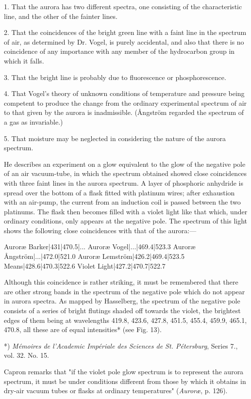 \documentclass[a4paper, 12pt, oneside, polutonikogreek, english]{article}
\begin{document}
1. That the aurora has two different spectra, one consisting of the characteristic line, and the other of the fainter lines.

2. That the coincidences of the bright green line with a faint line in the spectrum of air, as determined by Dr. Vogel, is purely accidental, and also that there is no coincidence of any importance with any member of the hydrocarbon group in which it falls.

3. That the bright line is probably due to fluorescence or phosphorescence.

4. That Vogel's theory of unknown conditions of temperature and pressure being competent to produce the change from the ordinary experimental spectrum of air to that given by the aurora is inadmissible. (Ångström regarded the spectrum of a gas as invariable.)

5. That moisture may be neglected in considering the nature of the aurora spectrum.

He describes an experiment on a glow equivalent to the glow of the negative pole of an air vacuum-tube, in which the spectrum obtained showed close coincidences with three faint lines in the aurora spectrum. A layer of phosphoric anhydride is spread over the bottom of a flask fitted with platinum wires; after exhaustion with an air-pump, the current from an induction coil is passed between the two platinums. The flask then becomes filled with a violet light like that which, under ordinary conditions, only appears at the negative pole. The spectrum of this light shows the following close coincidences with that of the aurora:---

Auroræ Barker|431|470.5|... 
Auroræ Vogel|...|469.4|523.3 
Auroræ Ångström|...|472.0|521.0 
Auroræ Lemström|426.2|469.4|523.5 
Means|428.6|470.3|522.6 
Violet Light|427.2|470.7|522.7 

Although this coincidence is rather striking, it must be remembered that there are other strong bands in the spectrum of the negative pole which do not appear in aurora spectra. As mapped by Hasselberg, the spectrum of the negative pole consists of a series of bright flutings shaded off towards the violet, the brightest edges of them being at wavelengths 419.8, 423.6, 427.8, 451.5, 455.4, 459.9, 465.1, 470.8, all these are of equal intensities* (see Fig. 13).

*) \emph{Mémoires de l'Academic Impériale des Sciences de St. Pétersburg}, Series 7., vol. 32. No. 15.

Capron remarks that "if the violet pole glow spectrum is to represent the aurora spectrum, it must be under conditions different from those by which it obtains in dry-air vacuum tubes or flasks at ordinary temperatures" (\emph{Auroræ}, p. 126).
\end{document}
